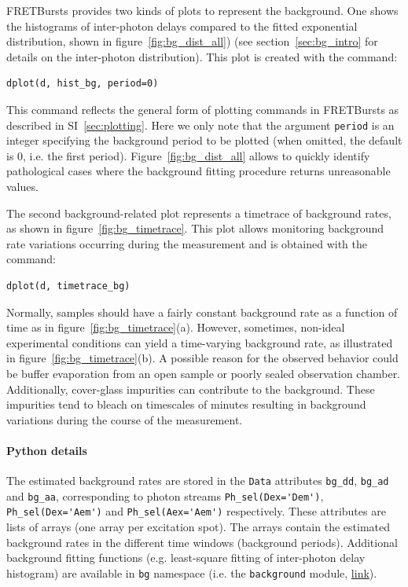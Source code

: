 \documentclass[10pt,letterpaper]{article}
\begin{document}
FRETBursts provides two kinds of plots to represent the background. One shows the histograms
of inter-photon delays compared to the fitted exponential distribution, shown in
figure~\ref{fig:bg_dist_all}) (see section~\ref{sec:bg_intro} for details on the inter-photon distribution).
This plot is created with the command:

\begin{lstlisting}
dplot(d, hist_bg, period=0)
\end{lstlisting}

This command reflects the general form of plotting commands in FRETBursts
as described in SI~\ref{sec:plotting}.
Here we only note that the argument \verb|period| is an integer specifying the background
period to be plotted (when omitted, the default is 0, i.e. the first period).
Figure~\ref{fig:bg_dist_all} allows to quickly identify pathological cases where the
background fitting procedure returns unreasonable values.

The second background-related plot represents a timetrace of background rates,
as shown in figure~\ref{fig:bg_timetrace}. This plot allows monitoring background rate variations
occurring during the measurement and is obtained with the command:

\begin{lstlisting}
dplot(d, timetrace_bg)
\end{lstlisting}

Normally, samples should have a fairly constant background rate as a function of time
as in figure~\ref{fig:bg_timetrace}(a). However, sometimes, non-ideal
experimental conditions can yield a time-varying background rate, as illustrated in
figure~\ref{fig:bg_timetrace}(b).
A possible reason for the observed behavior could be buffer evaporation from an open sample
or poorly sealed observation chamber. Additionally,
cover-glass impurities can contribute to the background.
These impurities tend to bleach on timescales of minutes resulting in
background variations during the course of the measurement.

\paragraph{Python details}

The estimated background rates are stored in the \verb|Data| attributes
\verb|bg_dd|, \verb|bg_ad| and \verb|bg_aa|, corresponding to photon
streams \verb|Ph_sel(Dex='Dem')|, \verb|Ph_sel(Dex='Aem')| and \verb|Ph_sel(Aex='Aem')|
respectively.
These attributes are lists of arrays (one array per excitation spot).
The arrays contain the estimated background rates in the different time windows
(background periods).
Additional background fitting functions (e.g. least-square fitting of inter-photon delay
histogram) are available in \verb|bg| namespace
(i.e. the \verb|background| module,
\href{http://fretbursts.readthedocs.org/en/latest/background.html}{link}).
\end{document}
